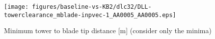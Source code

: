 \begin{figure}[!ht]
\begin{center}
	\texttt{[image: figures/baseline-vs-KB2/dlc32/DLL-towerclearance\_mblade-inpvec-1\_AA0005\_AA0005.eps]}
\end{center}
\caption{Minimum tower to blade tip distance [m] (consider only the minima)}
\label{fig:baseline-vs-KB2:dlc32:tower-tip-clearance}
\end{figure}

